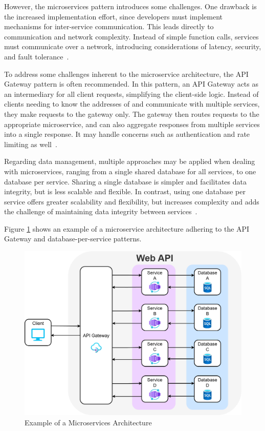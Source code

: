 \documentclass[12pt, reqno, oneside]{amsbook}
\theoremstyle{definition}
\theoremstyle{definition}
\numberwithin{section}{chapter}
\numberwithin{table}{chapter}
\numberwithin{figure}{chapter}
\begin{document}
However, the microservices pattern introduces some challenges. One drawback is the increased implementation effort, since developers must implement mechanisms for inter-service communication. This leads directly to communication and network complexity. Instead of simple function calls, services must communicate over a network, introducing considerations of latency, security, and fault tolerance~\cite{Taibi2018, Adrio2023, Khalfaoui2025, Figueira2024, Kenan2020, Villamizar2015, Yoo2025}.

To address some challenges inherent to the microservice architecture, the API Gateway pattern is often recommended. In this pattern, an API Gateway acts as an intermediary for all client requests, simplifying the client-side logic. Instead of clients needing to know the addresses of and communicate with multiple services, they make requests to the gateway only. The gateway then routes requests to the appropriate microservice, and can also aggregate responses from multiple services into a single response. It may handle concerns such as authentication and rate limiting as well~\cite{Taibi2018, Adrio2023, Khalfaoui2025, Kenan2020}.

Regarding data management, multiple approaches may be applied when dealing with microservices, ranging from a single shared database for all services, to one database per service. Sharing a single database is simpler and facilitates data integrity, but is less scalable and flexible. In contrast, using one database per service offers greater scalability and flexibility, but increases complexity and adds the challenge of maintaining data integrity between services~\cite{Taibi2018, Khalfaoui2025, Kenan2020}.

Figure \ref{Figure:Microservices_Architecture} shows an example of a microservice architecture adhering to the \ac{API} Gateway and database-per-service patterns.

\FloatBarrier
\begin{figure}[H]
  \includegraphics[width=0.9\linewidth]{images/MicroservicesArchitecture.png}
  \caption{\label{Figure:Microservices_Architecture}Example of a Microservices Architecture}
\end{figure}
\FloatBarrier
\end{document}
